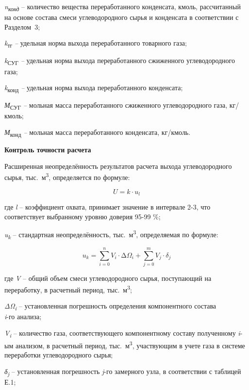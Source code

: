 \begin{multicols}{2}
\emph{n\textsubscript{конд}} -- количество вещества переработанного
конденсата, кмоль, рассчитанный на основе состава смеси углеводородного
сырья и конденсата в соответствии с Разделом~3;

\emph{k}\textsubscript{тг} \emph{--} удельная норма выхода
переработанного товарного газа;

\emph{k}\textsubscript{СУГ} \emph{--} удельная норма выхода
переработанного сжиженного углеводородного газа;

\emph{k}\textsubscript{конд} \emph{--} удельная норма выхода
переработанного конденсата;

\emph{М}\textsubscript{СУГ} \emph{--} мольная масса переработанного
сжиженного углеводородного газа, кг/кмоль;

\emph{М}\textsubscript{конд} \emph{--} мольная масса переработанного
конденсата, кг/кмоль.

{\bfseries Контроль точности расчета}

Расширенная неопределённость результатов расчета выхода углеводородного
сырья, тыс.~м\textsuperscript{3}, определяется по формуле:

\begin{equation}
U = k \cdot u_{l}
\end{equation}

где \emph{l} -- коэффициент охвата, принимает значение в интервале 2-3,
что соответствует выбранному уровню доверия 95-99 \%;

\emph{u\textsubscript{k}} -- стандартная неопределённость,
тыс.~м\textsuperscript{3}, определяемая по формуле:

\begin{equation}
u_{k} = \sum_{i = 0}^{n}{V_{i} \cdot \mathrm{\Delta}\Omega_{i}} + \sum_{j = 0}^{m}{V_{j} \cdot \delta_{j}}
\end{equation}

где \emph{V} -- общий объем смеси углеводородного сырья, поступающий на
переработку, в расчетный период, тыс.~м\textsuperscript{3};

\emph{ΔΩ\textsubscript{i}} -- установленная погрешность определения
компонентного состава\\
\emph{i}-го анализа;

\emph{V\textsubscript{i}} -- количество газа, соответствующего
компонентному составу полученному \emph{i}-ым анализом, в расчетный
период, тыс.~м\textsuperscript{3}, участвующим в учете газа в системе
переработки углеводородного сырья;

\emph{δ\textsubscript{j}} -- установленная погрешность \emph{j}-го
замерного узла, в соответствии с таблицей Е.1;


\end{multicols}

